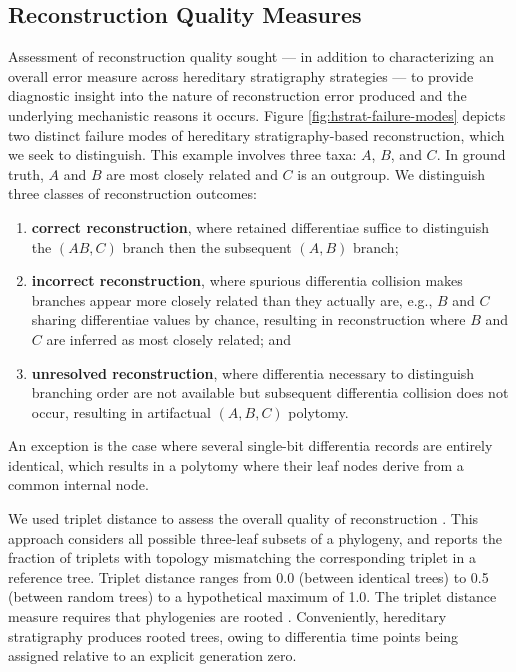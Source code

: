 \subsection{Reconstruction Quality Measures}



Assessment of reconstruction quality sought --- in addition to characterizing an overall error measure across hereditary stratigraphy strategies --- to provide diagnostic insight into the nature of reconstruction error produced and the underlying mechanistic reasons it occurs.
Figure \ref{fig:hstrat-failure-modes} depicts two distinct failure modes of hereditary stratigraphy-based reconstruction, which we seek to distinguish.
This example involves three taxa: $A$, $B$, and $C$.
In ground truth, $A$ and $B$ are most closely related and $C$ is an outgroup.
We distinguish three classes of reconstruction outcomes:
\begin{enumerate}
\item \textbf{correct reconstruction}, where retained differentiae suffice to distinguish the $(AB,C)$ branch then the subsequent $(A,B)$ branch;
\item \textbf{incorrect reconstruction}, where spurious differentia collision makes branches appear more closely related than they actually are, e.g., $B$ and $C$ sharing differentiae values by chance, resulting in reconstruction where $B$ and $C$ are inferred as most closely related; and
\item \textbf{unresolved reconstruction}, where differentia necessary to distinguish branching order are not available but subsequent differentia collision does not occur, resulting in artifactual $(A,B,C)$ polytomy.
\end{enumerate}
An exception is the case where several single-bit differentia records are entirely identical, which results in a polytomy where their leaf nodes derive from a common internal node.

We used triplet distance to assess the overall quality of reconstruction \citep{critchlow1996triples}.
This approach considers all possible three-leaf subsets of a phylogeny, and reports the fraction of triplets with topology mismatching the corresponding triplet in a reference tree.
Triplet distance ranges from 0.0 (between identical trees) to 0.5 (between random trees) to a hypothetical maximum of 1.0.
The triplet distance measure requires that phylogenies are rooted \citep{estabrook1985comparison}.
Conveniently, hereditary stratigraphy produces rooted trees, owing to differentia time points being assigned relative to an explicit generation zero.

